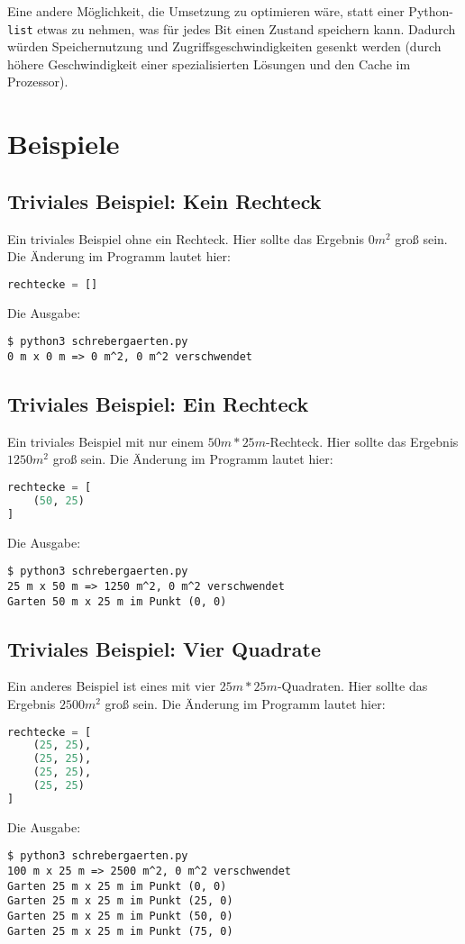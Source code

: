 \documentclass[a4paper,10pt,ngerman]{scrartcl}
\begin{document}
Eine andere Möglichkeit, die Umsetzung zu optimieren wäre, statt einer Python-\texttt{list} etwas zu nehmen, was für jedes Bit einen Zustand speichern kann. Dadurch würden Speichernutzung und Zugriffsgeschwindigkeiten gesenkt werden (durch höhere Geschwindigkeit einer spezialisierten Lösungen und den Cache im Prozessor).

\section{Beispiele}


\subsection{Triviales Beispiel: Kein Rechteck}
Ein triviales Beispiel ohne ein Rechteck. Hier sollte das Ergebnis $0m^2$ groß sein. Die Änderung im Programm lautet hier:
\begin{lstlisting}[language=Python]
rechtecke = []
\end{lstlisting}
Die Ausgabe:
\begin{lstlisting}
$ python3 schrebergaerten.py
0 m x 0 m => 0 m^2, 0 m^2 verschwendet
\end{lstlisting}

\subsection{Triviales Beispiel: Ein Rechteck}
Ein triviales Beispiel mit nur einem $50m*25m$-Rechteck. Hier sollte das Ergebnis $1250m^2$ groß sein. Die Änderung im Programm lautet hier:
\begin{lstlisting}[language=Python]
rechtecke = [
    (50, 25)
]
\end{lstlisting}
Die Ausgabe:
\begin{lstlisting}
$ python3 schrebergaerten.py
25 m x 50 m => 1250 m^2, 0 m^2 verschwendet
Garten 50 m x 25 m im Punkt (0, 0)
\end{lstlisting}


\subsection{Triviales Beispiel: Vier Quadrate} 
Ein anderes Beispiel ist eines mit vier $25m*25m$-Quadraten. Hier sollte das Ergebnis $2500m^2$ groß sein. Die Änderung im Programm lautet hier:
\begin{lstlisting}[language=Python]
rechtecke = [
    (25, 25),
    (25, 25),
    (25, 25),
    (25, 25)
]
\end{lstlisting}
Die Ausgabe:
\begin{lstlisting}
$ python3 schrebergaerten.py
100 m x 25 m => 2500 m^2, 0 m^2 verschwendet
Garten 25 m x 25 m im Punkt (0, 0)
Garten 25 m x 25 m im Punkt (25, 0)
Garten 25 m x 25 m im Punkt (50, 0)
Garten 25 m x 25 m im Punkt (75, 0)
\end{lstlisting}
\end{document}

